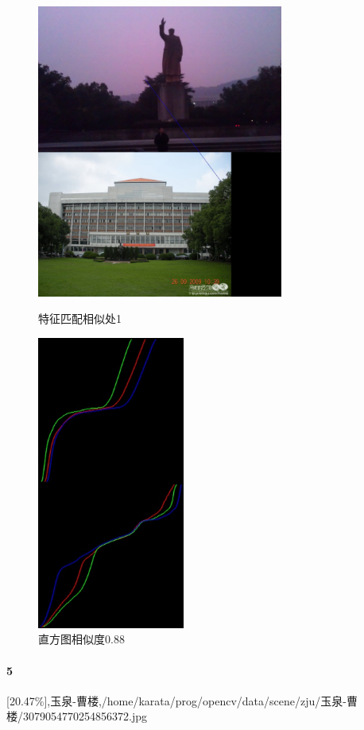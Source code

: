 \begin{figure}[htb]
\begin{minipage}[t]{0.5\linewidth}
\centering
\includegraphics[height=3.8in]{玉泉毛像.jpg.d/im4sift.jpg}
\caption{特征匹配相似处1}
\label{fig:side:a}
\end{minipage}%
\begin{minipage}[t]{0.5\linewidth}
\centering
\includegraphics[height=3.8in]{玉泉毛像.jpg.d/im4hist2.jpg}
\caption{直方图相似度0.88}
\label{fig:side:a}
\end{minipage}%
\end{figure}

\paragraph{5}
[20.47\%],玉泉-曹楼,/home/karata/prog/opencv/data/scene/zju/玉泉-曹楼/3079054770254856372.jpg

